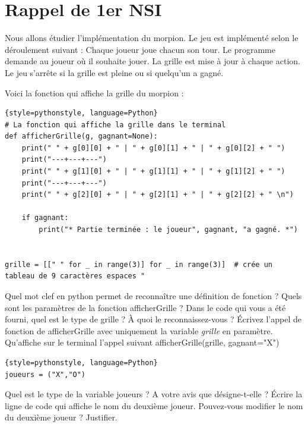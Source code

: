 

\setcounter{chapter}{-1}
\chapter*{Rappel de 1er NSI}
 Nous allons étudier l'implémentation du morpion. Le jeu est implémenté selon le déroulement suivant : Chaque joueur joue chacun son tour. Le programme demande au joueur où il souhaite jouer. La grille est mise à jour à chaque action. Le jeu s’arrête si la grille est pleine ou si quelqu’un a gagné.

Voici la fonction qui affiche la grille du morpion :
\begin{lstlisting}{style=pythonstyle, language=Python}
# La fonction qui affiche la grille dans le terminal
def afficherGrille(g, gagnant=None):
    print(" " + g[0][0] + " | " + g[0][1] + " | " + g[0][2] + " ")
    print("---+---+---")
    print(" " + g[1][0] + " | " + g[1][1] + " | " + g[1][2] + " ")
    print("---+---+---")
    print(" " + g[2][0] + " | " + g[2][1] + " | " + g[2][2] + " \n")
    
    if gagnant:
        print("* Partie terminée : le joueur", gagnant, "a gagné. *")


grille = [[" " for _ in range(3)] for _ in range(3)]  # crée un tableau de 9 caractères espaces " 
\end{lstlisting}

\begin{Exercise}[title={Rappels de fonction}]
\Question Quel mot clef en python permet de reconnaître une définition de fonction ?
\Question Quels sont les paramètres de la fonction afficherGrille ?
\Question Dans le code qui vous a été fourni, quel est le type de grille ? À quoi le reconnaissez-vous ?
\Question Écrivez l'appel de fonction de afficherGrille avec uniquement la variable \textit{grille} en paramètre.
\Question Qu'affiche sur le terminal l'appel suivant afficherGrille(grille, gagnant="X")
\end{Exercise}

\begin{lstlisting}{style=pythonstyle, language=Python}
joueurs = ("X","O")
\end{lstlisting}
\begin{Exercise}[title={Rappels sur les tuples}]
\Question Quel est le type de la variable joueurs ?
\Question A votre avis que désigne-t-elle ?
\Question Écrire la ligne de code qui affiche le nom du deuxième joueur.
\Question Pouvez-vous modifier le nom du deuxième joueur ? Justifier.
\end{Exercise}


